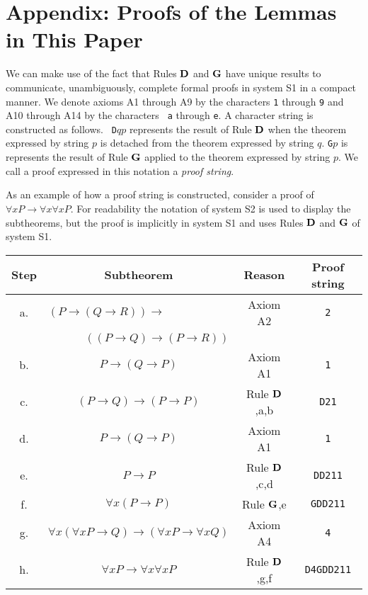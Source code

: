 \documentclass[leqno]{article}
\begin{document}
\section*{Appendix:  Proofs of the Lemmas in This Paper}

     We can make use of the fact that Rules ${\bf D}$ and ${\bf G}$ have
unique results to communicate, unambiguously, complete formal proofs in system
S1 in a compact manner.  We denote axioms A1 through A9 by the characters
{\tt 1} through {\tt 9} and A10 through A14 by the characters {\tt
a} through {\tt e}.  A character string is constructed as follows.  {\tt
D}$qp$ represents the result of Rule ${\bf D}$ when the theorem expressed by
string $p$ is detached from the theorem expressed by string $q$.  {\tt G}$p$
is represents the result of Rule ${\bf G}$ applied to the theorem expressed by
string $p$.  We call a proof expressed in this notation a {\em proof string}.

     As an example of how a proof string is constructed, consider a proof of
$\forall xP\rightarrow \forall x\forall xP$.  For readability the notation of
system S2 is used to display the subtheorems, but the proof is implicitly in
system S1 and uses Rules ${\bf D}$ and ${\bf G}$ of system S1.

\vspace{1ex}
\begin{tabular}{c|c|c|c}
 Step  &  Subtheorem		&	Reason  &      Proof string \\
\hline
   a. & \multicolumn{1}{l|}{$(P\rightarrow (Q\rightarrow R))\rightarrow $}
            	& Axiom A2   &   {\tt 2} \\
      & \multicolumn{1}{r|}{$((P\rightarrow
Q)\rightarrow (P\rightarrow R))$}	&     &     \\
   b. & $P\rightarrow (Q\rightarrow P)$		&			Axiom A1 & {\tt 1} \\
   c. & $(P\rightarrow Q)\rightarrow (P\rightarrow P)$		&		Rule
${\bf D}$,a,b  &  {\tt D21} \\
   d. & $P\rightarrow (Q\rightarrow P)$		&			Axiom A1 & {\tt 1} \\
   e. & $P\rightarrow P$		&			Rule ${\bf D}$,c,d  &  {\tt DD211} \\
   f. & $\forall x(P\rightarrow P)$		&			Rule ${\bf G}$,e & {\tt GDD211} \\
   g. & $\forall x(\forall xP\rightarrow Q)\rightarrow (\forall xP\rightarrow
\forall xQ)$	&	Axiom A4    &  {\tt 4} \\
   h. & $\forall xP\rightarrow \forall x\forall xP$		&		Rule
${\bf D}$,g,f  &  {\tt D4GDD211}
\end{tabular}
\end{document}
